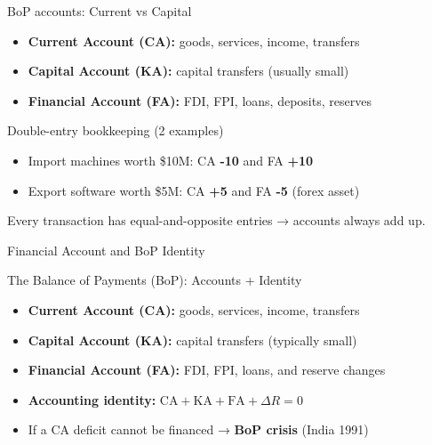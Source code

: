 \documentclass[
  ignorenonframetext,
  aspectratio=169,
]{beamer}
\makeatletter
\providecommand{\tightlist}{%
  \setlength{\itemsep}{0pt}\setlength{\parskip}{0pt}}
\let\quarto@originallabel\label
\DeclareRobustCommand*{\label}[1]{\quarto@originallabel{#1}}
\makeatother
\begin{document}
\begin{frame}{BoP accounts: Current vs Capital}
\label{bop-accounts-current-vs-capital}
\begin{itemize}
\tightlist
\item
  \textbf{Current Account (CA):} goods, services, income, transfers
\item
  \textbf{Capital Account (KA):} capital transfers (usually small)
\item
  \textbf{Financial Account (FA):} FDI, FPI, loans, deposits, reserves
\end{itemize}
\end{frame}

\begin{frame}{Double-entry bookkeeping (2 examples)}
\label{double-entry-bookkeeping-2-examples}
\begin{itemize}
\tightlist
\item
  Import machines worth \$10M: CA \textbf{-10} and FA \textbf{+10}
\item
  Export software worth \$5M: CA \textbf{+5} and FA \textbf{-5} (forex
  asset)
\end{itemize}

Every transaction has equal-and-opposite entries → accounts always add
up.
\end{frame}

\begin{frame}{Financial Account and BoP Identity}
\label{financial-account-and-bop-identity}
\end{frame}

\begin{frame}{The Balance of Payments (BoP): Accounts + Identity}
\label{the-balance-of-payments-bop-accounts-identity}
\begin{itemize}
\tightlist
\item
  \textbf{Current Account (CA):} goods, services, income, transfers
\item
  \textbf{Capital Account (KA):} capital transfers (typically small)
\item
  \textbf{Financial Account (FA):} FDI, FPI, loans, and reserve changes
\item
  \textbf{Accounting identity:}
  \(\text{CA} + \text{KA} + \text{FA} + \Delta R = 0\)
\item
  If a CA deficit cannot be financed → \textbf{BoP crisis} (India 1991)
\end{itemize}
\end{frame}
\end{document}
